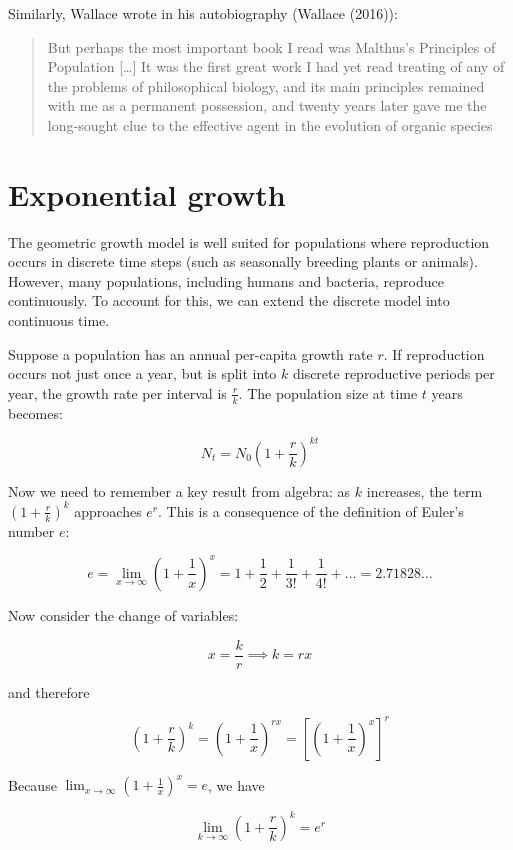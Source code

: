\documentclass[
  letterpaper,
]{scrbook}
\begin{document}
Similarly, Wallace wrote in his autobiography (Wallace (2016)):

\begin{quote}
But perhaps the most important book I read was Malthus's Principles of
Population {[}\ldots{]} It was the first great work I had yet read
treating of any of the problems of philosophical biology, and its main
principles remained with me as a permanent possession, and twenty years
later gave me the long-sought clue to the effective agent in the
evolution of organic species
\end{quote}

\section{Exponential growth}\label{exponential-growth}

The geometric growth model is well suited for populations where
reproduction occurs in discrete time steps (such as seasonally breeding
plants or animals). However, many populations, including humans and
bacteria, reproduce continuously. To account for this, we can extend the
discrete model into continuous time.

Suppose a population has an annual per-capita growth rate \(r\). If
reproduction occurs not just once a year, but is split into \(k\)
discrete reproductive periods per year, the growth rate per interval is
\(\frac{r}{k}\). The population size at time \(t\) years becomes:

\[
N_t = N_0 \left(1 + \frac{r}{k}\right)^{kt}
\]

Now we need to remember a key result from algebra: as \(k\) increases,
the term \(\left(1 + \frac{r}{k}\right)^{k}\) approaches \(e^r\). This
is a consequence of the definition of Euler's number \(e\):

\[
e = \lim_{x \to \infty} \left(1 + \frac{1}{x}\right)^x = 1 + \frac{1}{2} + \frac{1}{3!} + \frac{1}{4!} + \ldots = 2.71828 \ldots
\]

Now consider the change of variables:

\[
x = \frac{k}{r} \implies k = rx
\]

and therefore

\[
\left(1 + \frac{r}{k}\right)^{k} = \left(1 + \frac{1}{x}\right)^{rx} = \left[\left(1 + \frac{1}{x}\right)^x\right]^r 
\]

Because \(\lim_{x \to \infty} \left(1 + \frac{1}{x}\right)^x = e\), we
have

\[
\lim_{k \to \infty} \left(1 + \frac{r}{k}\right)^{k} = e^r
\]
\end{document}
